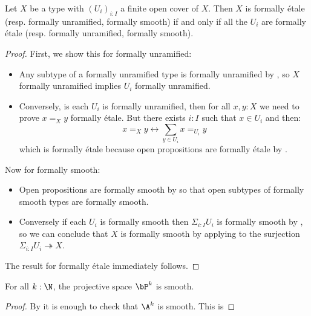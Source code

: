 \begin{lemma}\label{etale-zariski-local}
Let $X$ be a type with $(U_i)_{i:I}$ a finite open cover of $X$. Then $X$ is formally étale (resp. formally unramified, formally smooth) if and only if all the $U_i$ are formally étale (resp. formally unramified, formally smooth).
\end{lemma}

\begin{proof}
First, we show this for formally unramified:
\begin{itemize}
\item Any subtype of a formally unramified type is formally unramified by , so $X$ formally unramified implies $U_i$ formally unramified.
\item Conversely, is each $U_i$ is formally unramified, then for all $x,y:X$ we need to prove $x=_Xy$ formally étale. But there exists $i:I$ such that $x\in U_i$ and then:
\[x=_Xy \leftrightarrow \sum_{y\in U_i} x=_{U_i}y \]
which is formally étale because open propositions are formally étale by .
\end{itemize}
Now for formally smooth:
\begin{itemize}
\item Open propositions are formally smooth by  so that open subtypes of formally smooth types are formally smooth.
\item Conversely if each $U_i$ is formally smooth then $\Sigma_{i:I}U_i$ is formally smooth by , so we can conclude that $X$ is formally smooth by applying  to the surjection $\Sigma_{i:I}U_i \twoheadrightarrow X$.
\end{itemize}
The result for formally étale immediately follows.
\end{proof}

\begin{corollary}
For all $k:\N$, the projective space $\bP^k$ is smooth.
\end{corollary}

\begin{proof}
By  it is enough to check that $\A^k$ is smooth. This is 
\end{proof}




